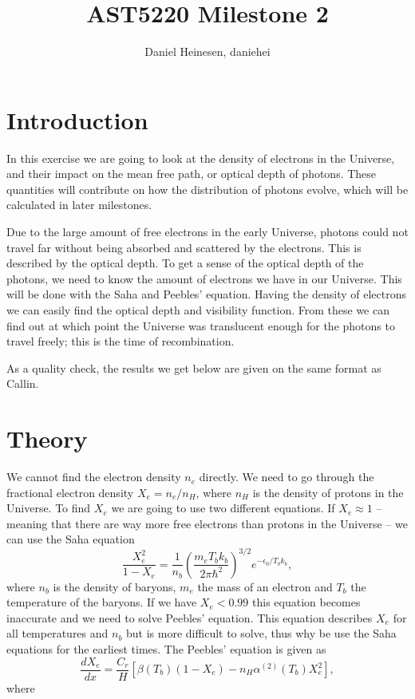 \documentclass[a4paper,norsk, 10pt]{article}
\title{AST5220 Milestone 2}
\author{Daniel Heinesen, daniehei}
\begin{document}
\maketitle
\section{Introduction}
In this exercise we are going to look at the density of electrons in the Universe, and their impact on the mean free path, or optical depth of photons. These quantities will contribute on how the distribution of photons evolve, which will be calculated in later milestones.

Due to the large amount of free electrons in the early Universe, photons could not travel far without being absorbed and scattered by the electrons. This is described by the optical depth. To get a sense of the optical depth of the photons, we need to know the amount of electrons we have in our Universe. This will be done with the Saha and Peebles' equation. Having the density of electrons we can easily find the optical depth and visibility function. From these we can find out at which point the Universe was translucent enough for the photons to travel freely; this is the time of recombination.

As a quality check, the results we get below are given on the same format as Callin\cite{callin}.

\section{Theory}
We cannot find the electron density $n_e$ directly. We need to go through the fractional electron density $X_e = n_e/n_H$, where $n_H$ is the density of protons in the Universe. To find $X_e$ we are going to use two different equations. If $X_e \approx 1$ -- meaning that there are way more free electrons than protons in the Universe -- we can use the Saha equation
\begin{equation}\label{eq:saha}
\frac{X_e^2}{1-X_e} = \frac{1}{n_b}\left(\frac{m_e T_b k_b}{2\pi \hbar^2}\right)^{3/2} e^{-\epsilon_0/T_b k_b},
\end{equation}
where $n_b$ is the density of baryons, $m_e$ the mass of an electron and $T_b$ the temperature of the baryons. If we have $X_e < 0.99$ this equation becomes inaccurate and we need to solve Peebles' equation. This equation describes $X_e$ for all temperatures and $n_b$ but is more difficult to solve, thus why be use the Saha equations for the earliest times. The Peebles' equation is given as
\begin{equation}\label{eq:peebles}
\frac{dX_e}{dx} = \frac{C_r}{H}\left[\beta (T_b)(1-X_e) - n_H \alpha^{(2)}(T_b)X_e^2 \right],
\end{equation}
where
\end{document}
